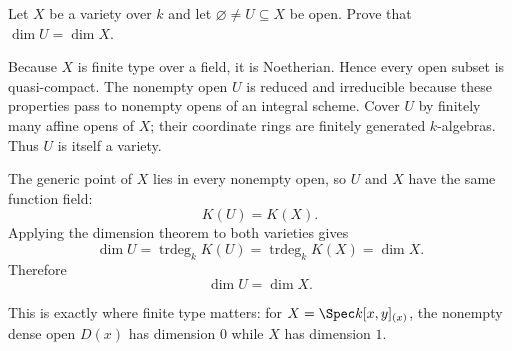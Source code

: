 \begin{problem}\label{prob:vi30-01}
Let \(X\) be a variety over \(k\) and let \(\varnothing\neq U\subseteq X\) be open. Prove that \(\dim U=\dim X\).

\end{problem}

\ifdefined\FullProblemDossiers
\begin{solution}
Because \(X\) is finite type over a field, it is Noetherian. Hence every open subset is quasi-compact. The
nonempty open \(U\) is reduced and irreducible because these properties pass to nonempty opens of an integral
scheme. Cover \(U\) by finitely many affine opens of \(X\); their coordinate rings are finitely generated
\(k\)-algebras. Thus \(U\) is itself a variety.

The generic point of \(X\) lies in every nonempty open, so \(U\) and \(X\) have the same function field:
\[
K(U)=K(X).
\]
Applying the dimension theorem to both varieties gives
\[
\dim U
=
\operatorname{trdeg}_kK(U)
=
\operatorname{trdeg}_kK(X)
=
\dim X.
\]
Therefore
\[
\boxed{\dim U=\dim X}.
\]

This is exactly where finite type matters: for \(X=\Spec k[x,y]_{(x)}\), the nonempty dense open \(D(x)\) has
dimension \(0\) while \(X\) has dimension \(1\).
\end{solution}
\fi
